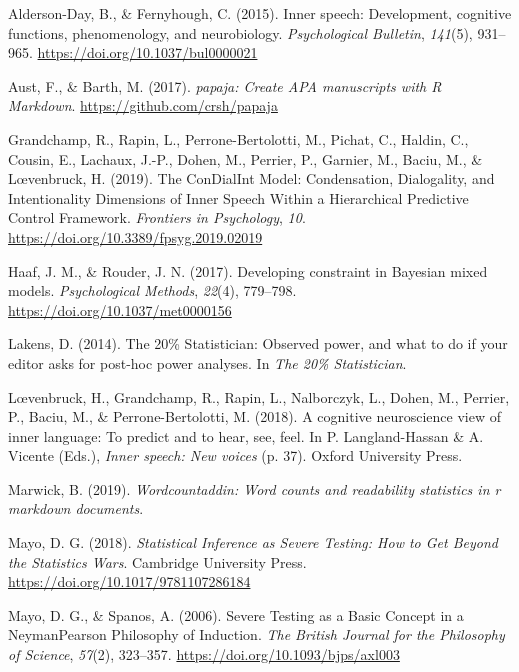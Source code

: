 \documentclass[
  english,
  man,floatsintext]{apa6}
\newlength{\cslhangindent}
\newenvironment{cslreferences}%
  {\setlength{\parindent}{0pt}%
  \everypar{\setlength{\hangindent}{\cslhangindent}}\ignorespaces}%
  {\par}
\begin{document}
\hypertarget{refs}{}
\begin{cslreferences}
\leavevmode\hypertarget{ref-alderson-day_inner_2015}{}%
Alderson-Day, B., \& Fernyhough, C. (2015). Inner speech: Development, cognitive functions, phenomenology, and neurobiology. \emph{Psychological Bulletin}, \emph{141}(5), 931--965. \url{https://doi.org/10.1037/bul0000021}

\leavevmode\hypertarget{ref-R-papaja}{}%
Aust, F., \& Barth, M. (2017). \emph{papaja: Create APA manuscripts with R Markdown}. \url{https://github.com/crsh/papaja}

\leavevmode\hypertarget{ref-grandchamp_condialint_2019}{}%
Grandchamp, R., Rapin, L., Perrone-Bertolotti, M., Pichat, C., Haldin, C., Cousin, E., Lachaux, J.-P., Dohen, M., Perrier, P., Garnier, M., Baciu, M., \& Lœvenbruck, H. (2019). The ConDialInt Model: Condensation, Dialogality, and Intentionality Dimensions of Inner Speech Within a Hierarchical Predictive Control Framework. \emph{Frontiers in Psychology}, \emph{10}. \url{https://doi.org/10.3389/fpsyg.2019.02019}

\leavevmode\hypertarget{ref-haaf_developing_2017}{}%
Haaf, J. M., \& Rouder, J. N. (2017). Developing constraint in Bayesian mixed models. \emph{Psychological Methods}, \emph{22}(4), 779--798. \url{https://doi.org/10.1037/met0000156}

\leavevmode\hypertarget{ref-lakens_20_2014}{}%
Lakens, D. (2014). The 20\% Statistician: Observed power, and what to do if your editor asks for post-hoc power analyses. In \emph{The 20\% Statistician}.

\leavevmode\hypertarget{ref-loevenbruck_cognitive_2018}{}%
Lœvenbruck, H., Grandchamp, R., Rapin, L., Nalborczyk, L., Dohen, M., Perrier, P., Baciu, M., \& Perrone-Bertolotti, M. (2018). A cognitive neuroscience view of inner language: To predict and to hear, see, feel. In P. Langland-Hassan \& A. Vicente (Eds.), \emph{Inner speech: New voices} (p. 37). Oxford University Press.

\leavevmode\hypertarget{ref-R-wordcountaddin}{}%
Marwick, B. (2019). \emph{Wordcountaddin: Word counts and readability statistics in r markdown documents}.

\leavevmode\hypertarget{ref-mayo_statistical_2018}{}%
Mayo, D. G. (2018). \emph{Statistical Inference as Severe Testing: How to Get Beyond the Statistics Wars}. Cambridge University Press. \url{https://doi.org/10.1017/9781107286184}

\leavevmode\hypertarget{ref-mayo_severe_2006}{}%
Mayo, D. G., \& Spanos, A. (2006). Severe Testing as a Basic Concept in a NeymanPearson Philosophy of Induction. \emph{The British Journal for the Philosophy of Science}, \emph{57}(2), 323--357. \url{https://doi.org/10.1093/bjps/axl003}


\end{cslreferences}
\end{document}
